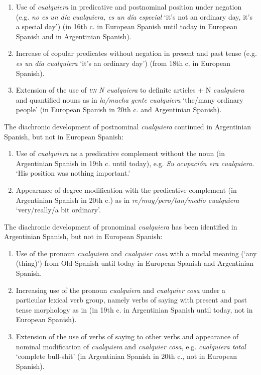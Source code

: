 \begin{enumerate}[label=\arabic*., leftmargin=2em]
    \item Use of \textit{cualquiera} in predicative and postnominal position under negation (e.g. \textit{no es un día cualquiera, es un día especial} ‘it’s not an ordinary day, it’s a special day’) (in 16th c. in European Spanish until today in European Spanish and in Argentinian Spanish).
    
    \item Increase of copular predicates without negation in present and past tense (e.g. \textit{es un día cualquiera} ‘it’s an ordinary day’) (from 18th c. in European Spanish).
    
    \item Extension of the use of \textit{\textsc{un} N cualquiera} to definite articles + N \textit{cualquiera} and quantified nouns as in \textit{la/mucha gente cualquiera} ‘the/many ordinary people’ (in European Spanish in 20th c. and Argentinian Spanish).

\end{enumerate}

The diachronic development of postnominal \textit{cualquiera} continued in Argentinian Spanish, but not in European Spanish:

\begin{enumerate}[label=\arabic*., leftmargin=2em, start=6]
    \item Use of \textit{cualquiera} as a predicative complement without the noun (in Argentinian Spanish in 19th c. until today), e.g. \textit{Su ocupación era cualquiera.} ‘His position was nothing important.’
    
    \item Appearance of degree modification with the predicative complement (in Argentinian Spanish in 20th c.) as in \textit{re/muy/pero/tan/medio cualquiera} ‘very/really/a bit ordinary’.
    
\end{enumerate}

The diachronic development of pronominal \textit{cualquiera} has been identified in Argentinian Spanish, but not in European Spanish:

\begin{enumerate}[label=\arabic*., leftmargin=2em]
    \item Use of the pronoun \textit{cualquiera} and \textit{cualquier cosa} with a modal meaning (‘any (thing)’) from Old Spanish until today in European Spanish and Argentinian Spanish.
    
    \item Increasing use of the pronoun \textit{cualquiera} and \textit{cualquier cosa} under a particular lexical verb group, namely verbs of saying with present and past tense morphology as in  (in 19th c. in Argentinian Spanish until today, not in European Spanish).
    
    \item Extension of the use of verbs of saying to other verbs and appearance of nominal modification of \textit{cualquiera} and \textit{cualquier cosa}, e.g. \textit{cualquiera total} ‘complete bull-shit’ (in Argentinian Spanish in 20th c., not in European Spanish).
\end{enumerate}



